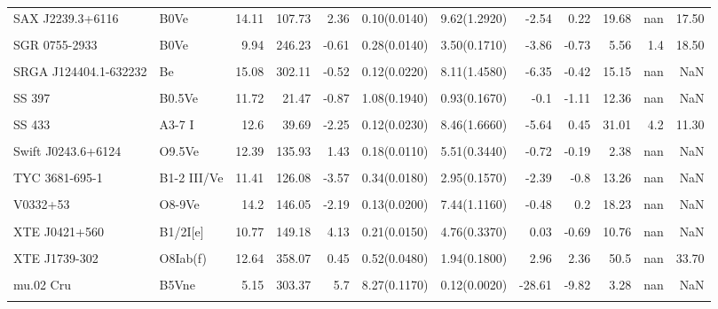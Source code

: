 \begin{longtable}{llrrrllrrrrr}
SAX J2239.3+6116 & B0Ve & 14.11 & 107.73 & 2.36 & 0.10(0.0140) & 9.62(1.2920) & -2.54 & 0.22 & 19.68 & nan & 17.50 \\ \\
SGR 0755-2933 & B0Ve & 9.94 & 246.23 & -0.61 & 0.28(0.0140) & 3.50(0.1710) & -3.86 & -0.73 & 5.56 & 1.4 & 18.50 \\ \\
SRGA J124404.1-632232 & Be & 15.08 & 302.11 & -0.52 & 0.12(0.0220) & 8.11(1.4580) & -6.35 & -0.42 & 15.15 & nan & NaN \\ \\
SS 397 & B0.5Ve & 11.72 & 21.47 & -0.87 & 1.08(0.1940) & 0.93(0.1670) & -0.1 & -1.11 & 12.36 & nan & NaN \\ \\
SS 433 & A3-7 I & 12.6 & 39.69 & -2.25 & 0.12(0.0230) & 8.46(1.6660) & -5.64 & 0.45 & 31.01 & 4.2 & 11.30 \\ \\
Swift J0243.6+6124 & O9.5Ve & 12.39 & 135.93 & 1.43 & 0.18(0.0110) & 5.51(0.3440) & -0.72 & -0.19 & 2.38 & nan & NaN \\ \\
TYC 3681-695-1 & B1-2 III/Ve & 11.41 & 126.08 & -3.57 & 0.34(0.0180) & 2.95(0.1570) & -2.39 & -0.8 & 13.26 & nan & NaN \\ \\
V0332+53 & O8-9Ve & 14.2 & 146.05 & -2.19 & 0.13(0.0200) & 7.44(1.1160) & -0.48 & 0.2 & 18.23 & nan & NaN \\ \\
XTE J0421+560 & B1/2I[e] & 10.77 & 149.18 & 4.13 & 0.21(0.0150) & 4.76(0.3370) & 0.03 & -0.69 & 10.76 & nan & NaN \\ \\
XTE J1739-302 & O8Iab(f) & 12.64 & 358.07 & 0.45 & 0.52(0.0480) & 1.94(0.1800) & 2.96 & 2.36 & 50.5 & nan & 33.70 \\ \\
mu.02 Cru & B5Vne & 5.15 & 303.37 & 5.7 & 8.27(0.1170) & 0.12(0.0020) & -28.61 & -9.82 & 3.28 & nan & NaN \\ \\
\end{longtable}
